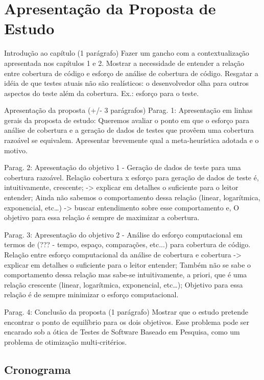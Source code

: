 \chapter[Apresentação da Proposta de Estudo]{Apresentação da Proposta de Estudo}

Introdução ao capítulo (1 parágrafo)
	Fazer um gancho com a contextualização apresentada nos capítulos 1 e 2. 
Mostrar a necessidade de entender a relação entre cobertura de código e esforço de análise de cobertura de código. 
		Resgatar a idéia de que testes atuais não são realísticos: o desenvolvedor olha para outros aspectos do teste além da cobertura. Ex.: esforço para o teste.

Apresentação da proposta (+/- 3 parágrafos)
	Parag. 1: Apresentação em linhas gerais da proposta de estudo:
		Queremos avaliar o ponto em que o esforço para análise de cobertura e a geração de dados de testes que provêem uma cobertura razoável se equivalem. 
		Apresentar brevemente qual a meta-heurística adotada e o motivo.
	
    Parag. 2: Apresentação do objetivo 1 - Geração de dados de teste para uma cobertura razoável.
		Relação cobertura x esforço para geração de dados de teste é, intuitivamente, crescente; -> explicar em detalhes o suficiente para o leitor entender;
		Ainda não sabemos o comportamento dessa relação (linear, logarítmica, exponencial, etc…) -> buscar entendimento sobre esse comportamento e,
		O objetivo para essa relação é sempre de maximizar a cobertura.
	
    Parag. 3: Apresentação do objetivo 2 - Análise do esforço computacional em termos de (??? - tempo, espaço, comparações, etc...) para cobertura de código.
		Relação entre esforço computacional da análise de cobertura e cobertura -> explicar em detalhes o suficiente para o leitor entender;
		Também não se sabe o comportamento dessa relação mas sabe-se intuitivamente, a priori, que é uma relação crescente (linear, logarítmica, exponencial, etc…);
		Objetivo para essa relação é de sempre minimizar o esforço computacional.

	Parag. 4: Conclusão da proposta (1 parágrafo)
		Mostrar que o estudo pretende encontrar o ponto de equilíbrio para os dois objetivos.
		Esse problema pode ser encarado sob a ótica de Testes de Software Baseado em Pesquisa, como um problema de otimização multi-critérios.


\section{Cronograma}



